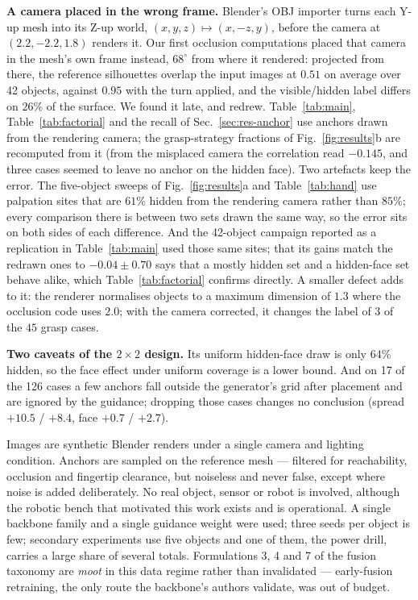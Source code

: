 \documentclass[conference]{IEEEtran}
\begin{document}
\textbf{A camera placed in the wrong frame.} Blender's OBJ importer turns each Y-up
mesh into its Z-up world, $(x, y, z) \mapsto (x, -z, y)$, before the camera at
$(2.2, -2.2, 1.8)$ renders it. Our first occlusion computations placed that camera in
the mesh's own frame instead, $68^\circ$ from where it rendered: projected from there,
the reference silhouettes overlap the input images at $0.51$ on average over 42
objects, against $0.95$ with the turn applied, and the visible/hidden label differs on
$26\%$ of the surface. We found it late, and redrew. Table~\ref{tab:main},
Table~\ref{tab:factorial} and the recall of Sec.~\ref{sec:res-anchor} use anchors drawn
from the rendering camera; the grasp-strategy fractions of Fig.~\ref{fig:results}b are
recomputed from it (from the misplaced camera the correlation read $-0.145$, and three
cases seemed to leave no anchor on the hidden face). Two artefacts keep the error. The
five-object sweeps of Fig.~\ref{fig:results}a and Table~\ref{tab:hand} use palpation
sites that are $61\%$ hidden from the rendering camera rather than $85\%$; every
comparison there is between two sets drawn the same way, so the error sits on both
sides of each difference. And the 42-object campaign reported as a replication in
Table~\ref{tab:main} used those same sites; that its gains match the redrawn ones to
$-0.04 \pm 0.70$ says that a mostly hidden set and a hidden-face set behave alike,
which Table~\ref{tab:factorial} confirms directly. A smaller defect adds to it: the
renderer normalises objects to a maximum dimension of $1.3$ where the occlusion code
uses $2.0$; with the camera corrected, it changes the label of $3$ of the $45$ grasp
cases.

\textbf{Two caveats of the $2\times2$ design.} Its uniform hidden-face draw is only
$64\%$ hidden, so the face effect under uniform coverage is a lower bound. And on 17 of
the 126 cases a few anchors fall outside the generator's grid after placement and are
ignored by the guidance; dropping those cases changes no conclusion (spread
$+10.5$ / $+8.4$, face $+0.7$ / $+2.7$).

Images are synthetic Blender renders under a single camera and lighting condition.
Anchors are sampled on the reference mesh --- filtered for reachability, occlusion and
fingertip clearance, but noiseless and never false, except where noise is added
deliberately. No real object, sensor or robot is involved, although the robotic bench
that motivated this work exists and is operational. A single backbone family and a
single guidance weight were used; three seeds per object is few; secondary experiments
use five objects and one of them, the power drill, carries a large share of several
totals. Formulations 3, 4 and 7 of the fusion taxonomy are \emph{moot} in this data
regime rather than invalidated --- early-fusion retraining, the only route the
backbone's authors validate, was out of budget.
\end{document}
